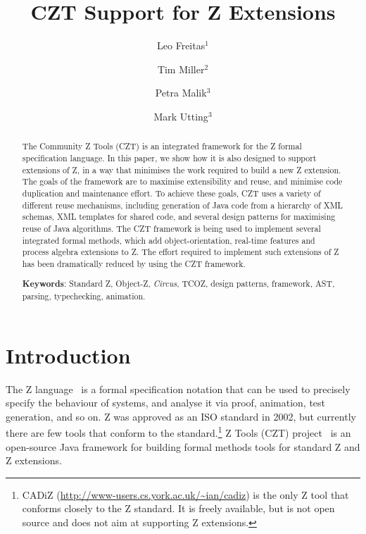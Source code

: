 \documentclass{llncs}
\newcommand{\Circus}{{\sf\slshape Circus}}
\begin{document}
\title{CZT Support for Z Extensions}
\author{Leo Freitas$^1$ \and Tim Miller$^2$ \and Petra Malik$^3$ \and Mark Utting$^3$}


\maketitle


\begin{abstract}
  The Community Z Tools (CZT) is an integrated
  framework for the Z formal specification language.  In this
  paper, we show how it is also designed to support extensions
  of Z, in a way that minimises the work required to build a
  new Z extension.  The goals of the framework are to maximise
  extensibility and reuse, and minimise code duplication and
  maintenance effort.  To achieve these goals, CZT uses a variety of
  different reuse mechanisms, including generation of Java
  code from a hierarchy of XML schemas, XML templates for shared
  code, and several design patterns for maximising reuse of Java
  algorithms.
  The CZT framework is being used to implement several integrated
  formal methods, which add object-orientation, real-time features
  and process algebra extensions to Z.  The effort required to
  implement such extensions of Z has been dramatically reduced
  by using the CZT framework.

  \noindent
  \textbf{Keywords}: Standard Z, Object-Z, \Circus, TCOZ, design patterns,
	 framework, AST, parsing, typechecking, animation.
\end{abstract}

\section{Introduction} \label{sec:intro}

  The Z language~\cite{isoz} is a formal specification notation that
  can be used to precisely specify the behaviour of systems, and
  analyse it via proof, animation, test generation, and so on.  
  Z was approved as an ISO standard in 2002, but currently there are few
  tools that conform to the standard.\footnote{CADiZ 
  (\url{http://www-users.cs.york.ac.uk/~ian/cadiz}) is the only Z tool
  that conforms closely to the Z standard.  It is freely available, 
  but is not open source and does not aim at supporting Z extensions.}
  Z Tools (CZT) project~\cite{czt} is an open-source Java framework
  for building formal methods tools for standard Z and Z extensions.
\end{document}
